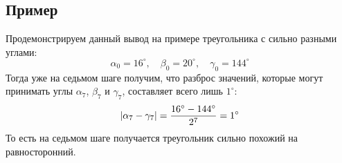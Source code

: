 \documentclass[a4paper,9pt,russian]{article}
\begin{document}
\subsection{Пример}
Продемонстрируем данный вывод на примере треугольника с сильно разными углами:
\begin{equation}
	\alpha_{0} = 16^{\circ},\quad \beta_0 = 20^{\circ}, \quad \gamma_0 = 144^{\circ}
\end{equation}
Тогда уже на седьмом шаге получим, что разброс значений, которые могут принимать углы $\alpha_7$, $\beta_7$ и $\gamma_7$, составляет всего лишь $1^{\circ}$:
\begin{equation}
	\abs{\alpha_{7} - \gamma_{7}} = \dfrac{16^{\circ} - 144^{\circ}}{2^7} = 1^{\circ}
\end{equation}
То есть на седьмом шаге получается треугольник сильно похожий на равносторонний.
\end{document}

